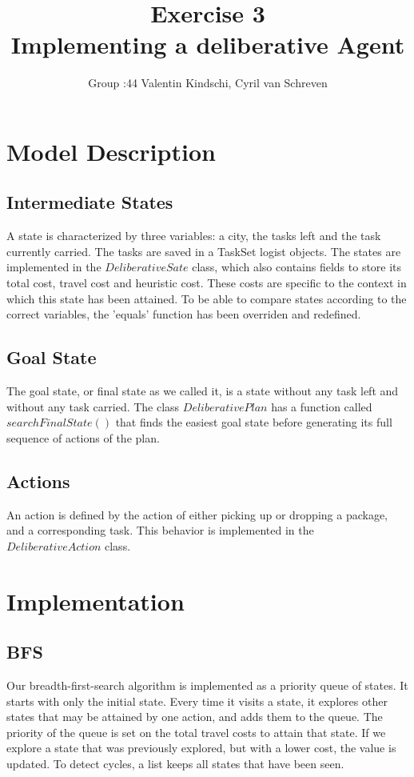 \documentclass[11pt]{article}
\title{\bf Exercise 3\\ Implementing a deliberative Agent}
\author{Group \textnumero:44 Valentin Kindschi, Cyril van Schreven}
\begin{document}
\maketitle

\section{Model Description}

\subsection{Intermediate States}
A state is characterized by three variables: a city, the tasks left and the task currently carried. The tasks are saved in a TaskSet logist objects. The states are implemented in the $DeliberativeSate$ class, which also contains fields to store its total cost, travel cost and heuristic cost. These costs are specific to the context in which this state has been attained. To be able to compare states according to the correct variables, the 'equals' function has been overriden and redefined.

\subsection{Goal State}
The goal state, or final state as we called it, is a state without any task left and without any task carried. The class $DeliberativePlan$ has a function called $searchFinalState()$ that finds the easiest goal state before generating its full sequence of actions of the plan.

\subsection{Actions}
An action is defined by the action of either picking up or dropping a package, and a corresponding task. This behavior is implemented in the $DeliberativeAction$ class.


\section{Implementation}

\subsection{BFS}
Our breadth-first-search algorithm is implemented as a priority queue of states. It starts with only the initial state. Every time it visits a state, it explores other states that may be attained by one action, and adds them to the queue. The priority of the queue is set on the total travel costs to attain that state. If we explore a state that was previously explored, but with a lower cost, the value is updated. To detect cycles, a list keeps all states that have been seen.
\end{document}
